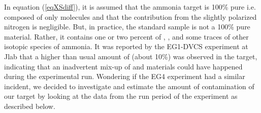 \begin{comment}
    \end{itemize}
  \item $E_{detector}$ stands/accounts for the detector efficiencies
  \item $N^{+/-}$: Number of scattered electrons for each helicity state (+/-).
  \item $N^{+/-}_{e^-}$: Number of incident electrons for +/- helicity states = $\left(\frac{ C_{Fcup}^{+/-}\cdot (10^{-9}/9264)}{Q_{e^-}} \right)\cdot \frac{C_{BPM}}{C_{Fcup}}$ with 
    \begin{itemize}
      \item $C_{Fcup}^{+/-}$: Helicity dependent Faraday-cup counts (live time gated)
      \item $\frac{10^9}{9264}$: Factor for converting Faraday cup counts into Coulombs. (The factor 1/9264 converts the counts into nano-coulombs.)
      \item $Q_e = 1.0602\times 10^{-19}(C)$: the electron charge. %
      \item $\frac{C_{BPM}}{C_{Fcup}}$: the ratio of the Beam-Position-Monitor (BPM) and Faraday-cup counts. The BPM is located before the target so its count doesn't suffer the loss, but the Faraday-cup is located at the end of the beamline and because its physical radius is not large enough, parts of the beam's halo are not collected. Since, the size of the halo depends on the amount of material in the beamline as well as on the beam energy, the ratio is a function of the beam energy. For high beam energies such as 3 GeV, the ratio is close to 1 but for the lower beam energies it is lower than 1. For example the ratio is 0.965919 for 2.3 GeV \cite{HK_dXs_extr}. 
    \end{itemize}
   \item $\Delta\Omega=sin\theta\cdot\Delta\theta\cdot\Delta\phi$: The solid angle for the given kinematic bin.
\end{itemize}

\end{comment}

In equation (\ref{eqXSdiff}), it is assumed that the ammonia target is 100\% pure i.e. composed of only %
 molecules and that the contribution from the slightly polarized nitrogen is negligible. But, in practice, the standard  sample is not a 100\% pure material. Rather, it contains one or two percent of ,  \cite{sarahTgt}, and some traces of other isotopic species of ammonia. %
It was reported by the EG1-DVCS experiment at Jlab \cite{bostedD2Cont}\cite{koiralaD2Cont} that a higher than usual amount of  (about 10\%) was observed in the  target, indicating that an inadvertent mix-up of  and  materials could have happened during the experimental run. Wondering if the EG4 experiment had a similar incident, we decided to investigate and estimate the amount of  contamination of our  target by looking at the data from the  run period of the experiment as described below.


